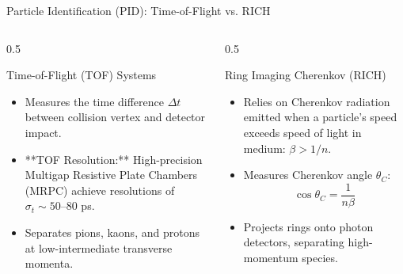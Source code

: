\documentclass[aspectratio=169]{beamer}
\begin{document}
\begin{frame}{Particle Identification (PID): Time-of-Flight vs. RICH}
    \begin{columns}
        \begin{column}{0.5\textwidth}
            \begin{block}{Time-of-Flight (TOF) Systems}
                \begin{itemize}
                    \item Measures the time difference $\Delta t$ between collision vertex and detector impact.
                    \item **TOF Resolution:** High-precision Multigap Resistive Plate Chambers (MRPC) achieve resolutions of $\sigma_t \sim 50\text{--}80$ ps.
                    \item Separates pions, kaons, and protons at low-intermediate transverse momenta.
                \end{itemize}
            \end{block}
        \end{column}
        \begin{column}{0.5\textwidth}
            \begin{block}{Ring Imaging Cherenkov (RICH)}
                \begin{itemize}
                    \item Relies on Cherenkov radiation emitted when a particle's speed exceeds speed of light in medium: $\beta > 1/n$.
                    \item Measures Cherenkov angle $\theta_C$:
                    \[ \cos\theta_C = \frac{1}{n\beta} \]
                    \item Projects rings onto photon detectors, separating high-momentum species.
                \end{itemize}
            \end{block}
        \end{column}
    \end{columns}
\end{frame}
\end{document}
